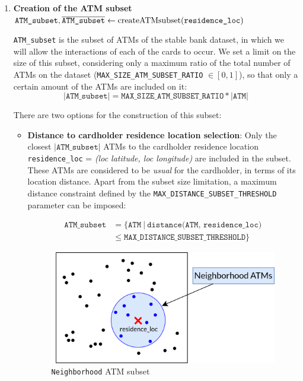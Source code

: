 \begin{enumerate}
    \item \textbf{Creation of the ATM subset} \\
    {\footnotesize \textcolor{teal}{$\texttt{ATM\_subset}, \overline{\texttt{ATM\_subset}} \gets \text{createATMsubset(\texttt{residence\_loc})}$}}

    \texttt{ATM\_subset} is the subset of ATMs of the stable bank dataset, in which we will allow the interactions of each of the cards to occur. We set a limit on the size of this subset, considering only a maximum ratio of the total number of ATMs on the dataset (\texttt{MAX\_SIZE\_ATM\_SUBSET\_RATIO} $\in [0,1]$), so that only a certain amount of the ATMs are included on it: 
    $$|\texttt{ATM\_subset}| = \texttt{MAX\_SIZE\_ATM\_SUBSET\_RATIO} * |\texttt{ATM}|$$ 

    There are two options for the construction of this subset:
    \begin{itemize}
        \item \textbf{Distance to cardholder residence location selection}: Only the closest $|\texttt{ATM\_subset}|$ ATMs to the cardholder residence location \texttt{residence\_loc} = \emph{(loc latitude, loc longitude)} are included in the subset. These ATMs are considered to be \textit{usual} for the cardholder, in terms of its location distance. Apart from the subset size limitation, a maximum distance constraint defined by the
        \texttt{MAX\_DISTANCE\_SUBSET\_THRESHOLD} parameter can be imposed:
        
        \begin{align*}
        \texttt{ATM\_subset} &= \{\texttt{ATM}\ |\ \texttt{distance(ATM, residence\_loc)} \\
        &\leq \texttt{MAX\_DISTANCE\_SUBSET\_THRESHOLD}\}
        \end{align*}
        
            \begin{figure}[H]
              \centering
              \includegraphics[scale=1.1]{images/1-DataModel/tx-generation-1-named.png}
              \caption{\texttt{Neighborhood} ATM subset}
            \end{figure}
    

\end{itemize}
\end{enumerate}
